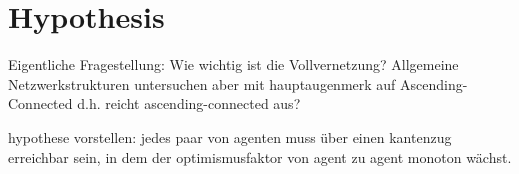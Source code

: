 \documentclass[Bachelorarbeit.tex]{subfiles}
\begin{document}
\chapter{Hypothesis}
Eigentliche Fragestellung: Wie wichtig ist die Vollvernetzung?
	Allgemeine Netzwerkstrukturen untersuchen aber mit hauptaugenmerk auf Ascending-Connected d.h. reicht ascending-connected aus?

hypothese vorstellen: jedes paar von agenten muss über einen kantenzug erreichbar sein, in dem der optimismusfaktor von agent zu agent monoton wächst.
\end{document}

